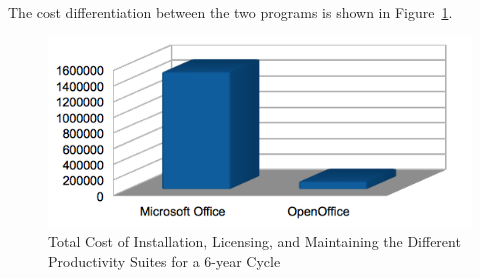 The cost differentiation between the two programs is shown in Figure~\ref{fig:Largo_cost}. 
\begin{figure}
\begin{center}
    \includegraphics[scale=0.9]{img/largocost.png}   
\end{center}
 \caption[Largo Office Cost ]{Total Cost of Installation, Licensing, and Maintaining the Different Productivity Suites for a 6-year Cycle}
    \label {fig:Largo_cost}

\end{figure}


